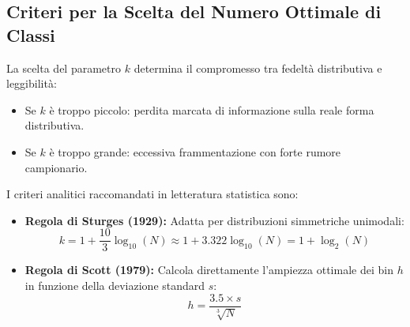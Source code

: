 \subsection{Criteri per la Scelta del Numero Ottimale di Classi}
La scelta del parametro $k$ determina il compromesso tra fedeltà distributiva e leggibilità:
\begin{itemize}
    \item Se $k$ è troppo piccolo: perdita marcata di informazione sulla reale forma distributiva.
    \item Se $k$ è troppo grande: eccessiva frammentazione con forte rumore campionario.
\end{itemize}
I criteri analitici raccomandati in letteratura statistica sono:
\begin{itemize}
    \item \textbf{Regola di Sturges (1929):} Adatta per distribuzioni simmetriche unimodali:
    \begin{equation}
    k = 1 + \frac{10}{3} \log_{10}(N) \approx 1 + 3.322 \log_{10}(N) = 1 + \log_2(N)
    \end{equation}
    \item \textbf{Regola di Scott (1979):} Calcola direttamente l'ampiezza ottimale dei bin $h$ in funzione della deviazione standard $s$:
    \begin{equation}
    h = \frac{3.5 \times s}{\sqrt[3]{N}}
    \end{equation}
\end{itemize}

